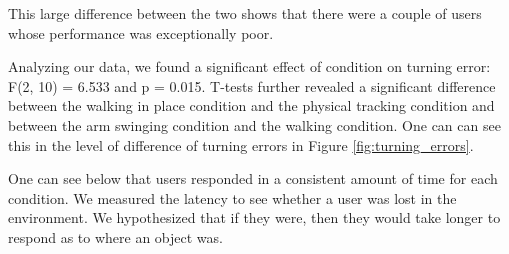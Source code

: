 \documentclass[titlepage]{article}
\theoremstyle{definition}
\theoremstyle{proof}
\begin{document}
This large difference between the two shows that
there were a couple of users whose performance was exceptionally poor.

Analyzing our data,
we found a significant effect of condition on turning error:
F(2, 10) = 6.533 and p = 0.015.
T-tests further revealed a significant difference between the walking in place condition
and the physical tracking condition
and between the arm swinging condition and the walking condition.
One can can see this in the level of difference of turning errors in Figure \ref{fig:turning_errors}.

One can see below that users responded in a consistent amount of time for each condition.
We measured the latency to see whether a user was lost in the environment.
We hypothesized that if they were, then they would take longer to respond as to where an object was.
\end{document}

